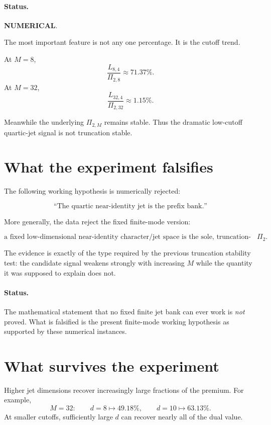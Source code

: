 \documentclass[11pt,a4paper]{article}
\newcommand{\NUM}{\textcolor{blue!70!black}{\textbf{NUMERICAL}}}
\begin{document}
\paragraph{Status.}
\NUM.

The most important feature is not any one percentage.
It is the cutoff trend.

At \(M=8\),
\[
\frac{L_{8,4}}{\Pi_{2,8}}
\approx71.37\%.
\]
At \(M=32\),
\[
\frac{L_{32,4}}{\Pi_{2,32}}
\approx1.15\%.
\]

Meanwhile the underlying \(\Pi_{2,M}\) remains stable.
Thus the dramatic low-cutoff quartic-jet signal is not truncation stable.

\section{What the experiment falsifies}

The following working hypothesis is numerically rejected:

\[
\boxed{
\text{``The quartic near-identity jet is the prefix bank.''}
}
\tag{33}
\]

More generally, the data reject the fixed finite-mode version:

\[
\boxed{
\text{a fixed low-dimensional near-identity character/jet space is the sole,
truncation-stable carrier of }\Pi_2.
}
\tag{34}
\]

The evidence is exactly of the type required by the previous truncation
stability test:
the candidate signal weakens strongly with increasing \(M\) while the
quantity it was supposed to explain does not.

\paragraph{Status.}
The mathematical statement that no fixed finite jet bank can ever work is
\emph{not} proved.
What is falsified is the present finite-mode working hypothesis as supported
by these numerical instances.

\section{What survives the experiment}

Higher jet dimensions recover increasingly large fractions of the premium.
For example,
\[
M=32:
\qquad
d=8\mapsto49.18\%,
\qquad
d=10\mapsto63.13\%.
\]
At smaller cutoffs, sufficiently large \(d\) can recover nearly all of the
dual value.
\end{document}
